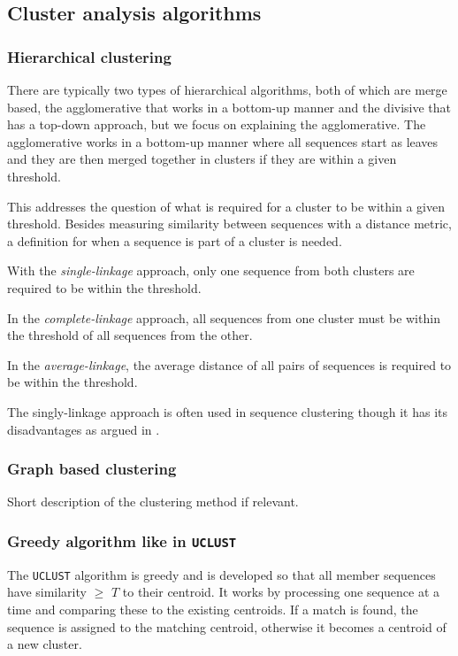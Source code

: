 \subsection{Cluster analysis algorithms}


\subsubsection{Hierarchical clustering}
There are typically two types of hierarchical algorithms, both of which are
merge based, the agglomerative that works in a bottom-up manner and the
divisive that has a top-down approach, but we focus on explaining the
agglomerative. The agglomerative works in a bottom-up manner where all
sequences start as leaves and they are then merged together in clusters if they
are within a given threshold.


This addresses the question of what is required for a cluster to be within a
given threshold. Besides measuring similarity between sequences with a distance
metric, a definition for when a sequence is part of a cluster is needed.

With the \textit{single-linkage} approach, only one sequence from both 
clusters are required to be within the threshold.

In the \textit{complete-linkage} approach, all sequences from one cluster 
must be within the threshold of all sequences from the other.

In the \textit{average-linkage}, the average distance of all pairs of 
sequences is required to be within the threshold.

The singly-linkage approach is often used in sequence clustering though it has
its disadvantages as argued in \cite[pp. 62-63]{dong}.

\subsubsection{Graph based clustering}
Short description of the clustering method if relevant.


\subsubsection{Greedy algorithm like in \texttt{UCLUST}} 
The \texttt{UCLUST} algorithm is greedy and is developed so that all member
sequences have similarity $\geq$ $T$ to their centroid.  It works by processing
one sequence at a time and comparing these to the existing centroids. If a
match is found, the sequence is assigned to the matching centroid, otherwise it
becomes a centroid of a new cluster.

